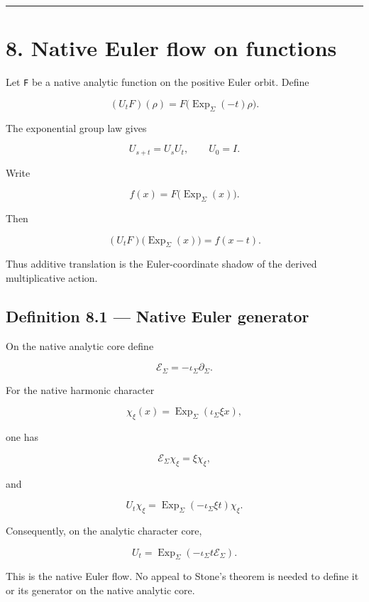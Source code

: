 \begin{center}\rule{0.5\linewidth}{0.5pt}\end{center}

\hypertarget{native-euler-flow-on-functions}{%
\section{8. Native Euler flow on functions}\label{native-euler-flow-on-functions}}

Let \texttt{F} be a native analytic function on the positive Euler orbit. Define

\[
(U_tF)(\rho)
=
F\bigl(\operatorname{Exp}_\Sigma(-t)\rho\bigr).
\]

The exponential group law gives

\[
U_{s+t}=U_sU_t,
\qquad
U_0=I.
\]

Write

\[
f(x)=F\bigl(\operatorname{Exp}_\Sigma(x)\bigr).
\]

Then

\[
(U_tF)\bigl(\operatorname{Exp}_\Sigma(x)\bigr)
=f(x-t).
\]

Thus additive translation is the Euler-coordinate shadow of the derived
multiplicative action.

\hypertarget{definition-8.1-native-euler-generator}{%
\subsection{Definition 8.1 --- Native Euler generator}\label{definition-8.1-native-euler-generator}}

On the native analytic core define

\[
\boxed{
\mathcal E_\Sigma
=-\iota_\Sigma\partial_\Sigma.
}
\]

For the native harmonic character

\[
\chi_\xi(x)
=
\operatorname{Exp}_\Sigma(\iota_\Sigma\xi x),
\]

one has

\[
\mathcal E_\Sigma\chi_\xi
=
\xi\chi_\xi,
\]

and

\[
U_t\chi_\xi
=
\operatorname{Exp}_\Sigma(-\iota_\Sigma\xi t)\chi_\xi.
\]

Consequently, on the analytic character core,

\[
\boxed{
U_t
=
\operatorname{Exp}_\Sigma(-\iota_\Sigma t\mathcal E_\Sigma).
}
\]

This is the native Euler flow. No appeal to Stone's theorem is needed to define
it or its generator on the native analytic core.


